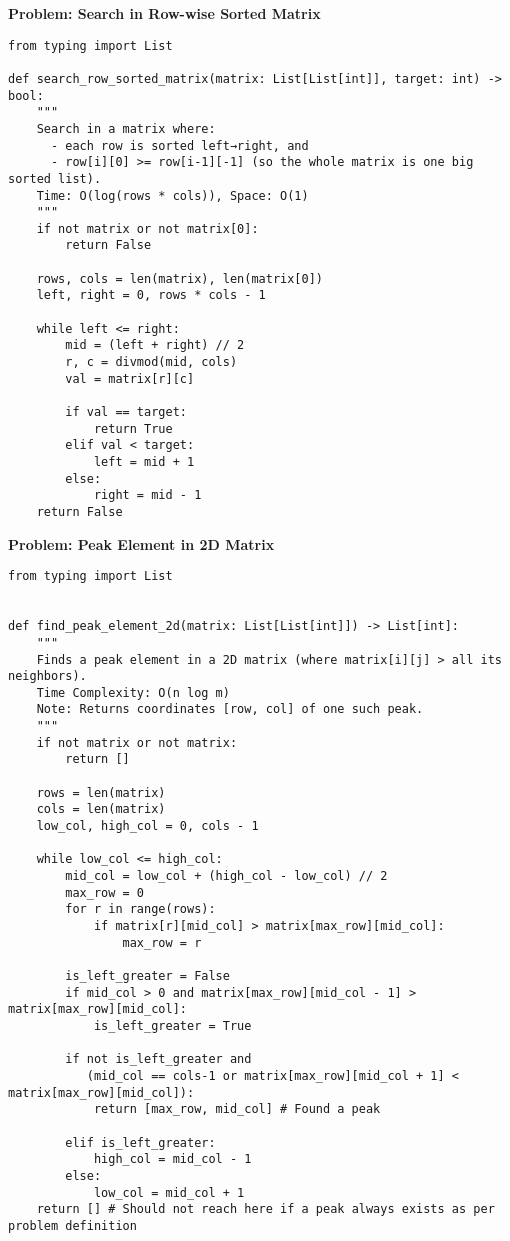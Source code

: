 \noindent\textbf{Problem: Search in Row-wise Sorted Matrix}
\begin{verbatim}
from typing import List

def search_row_sorted_matrix(matrix: List[List[int]], target: int) -> bool:
    """
    Search in a matrix where:
      - each row is sorted left→right, and
      - row[i][0] >= row[i-1][-1] (so the whole matrix is one big sorted list).
    Time: O(log(rows * cols)), Space: O(1)
    """
    if not matrix or not matrix[0]:
        return False

    rows, cols = len(matrix), len(matrix[0])
    left, right = 0, rows * cols - 1

    while left <= right:
        mid = (left + right) // 2
        r, c = divmod(mid, cols)
        val = matrix[r][c]

        if val == target:
            return True
        elif val < target:
            left = mid + 1
        else:
            right = mid - 1
    return False
\end{verbatim}

\noindent\textbf{Problem: Peak Element in 2D Matrix}
\begin{verbatim}
from typing import List


def find_peak_element_2d(matrix: List[List[int]]) -> List[int]:
    """
    Finds a peak element in a 2D matrix (where matrix[i][j] > all its neighbors).
    Time Complexity: O(n log m)
    Note: Returns coordinates [row, col] of one such peak.
    """
    if not matrix or not matrix:
        return []

    rows = len(matrix)
    cols = len(matrix)
    low_col, high_col = 0, cols - 1

    while low_col <= high_col:
        mid_col = low_col + (high_col - low_col) // 2
        max_row = 0
        for r in range(rows):
            if matrix[r][mid_col] > matrix[max_row][mid_col]:
                max_row = r

        is_left_greater = False
        if mid_col > 0 and matrix[max_row][mid_col - 1] > matrix[max_row][mid_col]:
            is_left_greater = True

        if not is_left_greater and 
           (mid_col == cols-1 or matrix[max_row][mid_col + 1] < matrix[max_row][mid_col]):
            return [max_row, mid_col] # Found a peak

        elif is_left_greater:
            high_col = mid_col - 1
        else:
            low_col = mid_col + 1
    return [] # Should not reach here if a peak always exists as per problem definition
\end{verbatim}
% 
